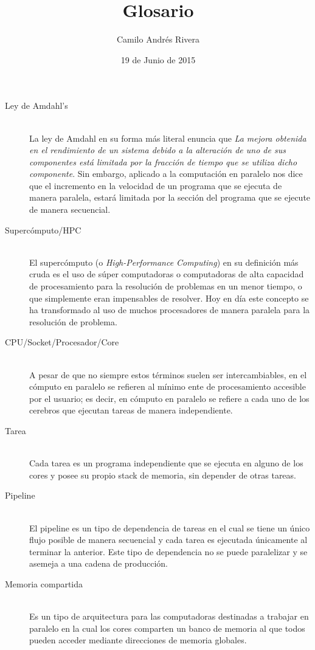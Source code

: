 \documentclass{article}
\title{Glosario}
\author{Camilo Andrés Rivera}
\date{19 de Junio de 2015}
\begin{document}
\maketitle

\begin{description}
	\item[Ley de Amdahl's] \hfill \\
	La ley de Amdahl en su forma más literal enuncia que \textit{La mejora obtenida en el rendimiento de un sistema debido a la alteración de uno de sus componentes está limitada por la fracción de tiempo que se utiliza dicho componente}. Sin embargo, aplicado a la computación en paralelo nos dice que el incremento en la velocidad de un programa que se ejecuta de manera paralela, estará limitada por la sección del programa que se ejecute de manera secuencial.
	\item[Supercómputo/HPC] \hfill \\
	El supercómputo (o \textit{High-Performance Computing}) en su definición más cruda es el uso de súper computadoras o computadoras de alta capacidad de procesamiento para la resolución de problemas en un menor tiempo, o que simplemente eran impensables de resolver. Hoy en día este concepto se ha transformado al uso de muchos procesadores de manera paralela para la resolución de problema.
	\item[CPU/Socket/Procesador/Core] \hfill \\
	A pesar de que no siempre estos términos suelen ser intercambiables, en el cómputo en paralelo se refieren al mínimo ente de procesamiento accesible por el usuario; es decir, en cómputo en paralelo se refiere a cada uno de los cerebros que ejecutan tareas de manera independiente.
	\item[Tarea] \hfill \\
	Cada tarea es un programa independiente que se ejecuta en alguno de los cores y posee su propio stack de memoria, sin depender de otras tareas.
	\item[Pipeline] \hfill \\
	El pipeline es un tipo de dependencia de tareas en el cual se tiene un único flujo posible de manera secuencial y cada tarea es ejecutada únicamente al terminar la anterior. Este tipo de dependencia no se puede paralelizar y se asemeja a una cadena de producción.
	\item[Memoria compartida] \hfill \\
	Es un tipo de arquitectura para las computadoras destinadas a trabajar en paralelo en la cual los cores comparten un banco de memoria al que todos pueden acceder mediante direcciones de memoria globales.

\end{description}
\end{document}
